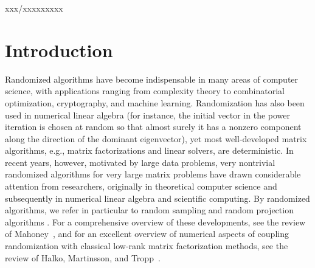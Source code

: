 \documentclass{siamltex}
\begin{document}
\begin{DOI}
   xxx/xxxxxxxxx
\end{DOI}


\section{Introduction}
\label{sec:introduction}

Randomized algorithms have become indispensable in many areas of computer
science, with applications ranging from complexity theory to combinatorial
optimization, cryptography, and machine learning.  Randomization has also been
used in numerical linear algebra (for instance, the initial vector in the power
iteration is chosen at random so that almost surely it has a nonzero component
along the direction of the dominant eigenvector), yet most well-developed matrix
algorithms, e.g., matrix factorizations and linear solvers, are deterministic.
In recent years, however, motivated by large data problems, very
nontrivial randomized algorithms for very large matrix problems have drawn
considerable attention from researchers, originally in theoretical computer
science and subsequently in numerical linear algebra and scientific computing.
By randomized algorithms, we refer in particular to random sampling and random
projection algorithms
\cite{drineas2006sampling,sarlos2006improved,drineas2007faster,rokhlin2008fast,avron2010blendenpik}.
For a comprehensive overview of these developments, see the review of
Mahoney~\cite{Mah-mat-rev_BOOK}, and for an excellent overview of numerical
aspects of coupling randomization with classical low-rank matrix factorization
methods, see the review of Halko, Martinsson, and Tropp~\cite{halko2011finding}.
\end{document}
